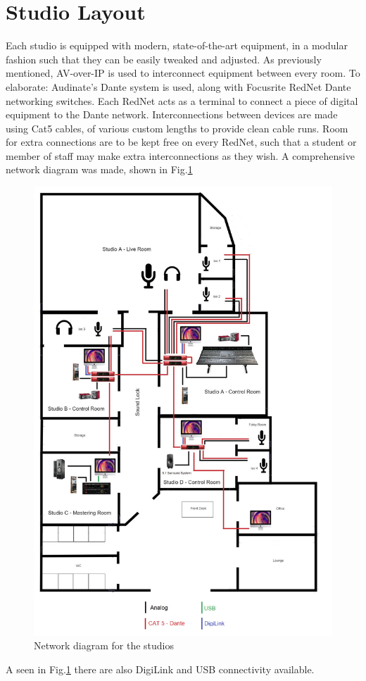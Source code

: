 \documentclass[10pt, twocolumn]{article}
\begin{document}
    \section{Studio Layout}
            Each studio is equipped with modern, state-of-the-art equipment, in a modular fashion such that they can be easily tweaked and adjusted.
            As previously mentioned, AV-over-IP is used to interconnect equipment between every room.
            To elaborate: Audinate's Dante system is used, along with Focusrite RedNet Dante networking switches.
            Each RedNet acts as a terminal to connect a piece of digital equipment to the Dante network.
            Interconnections between devices are made using Cat5 cables, of various custom lengths to provide clean cable runs.
            Room for extra connections are to be kept free on every RedNet, such that a student or member of staff may make extra interconnections as they wish.
            A comprehensive network diagram was made, shown in Fig.\ref{network}
            \begin{figure}[H]
                \centering
                \includegraphics[scale=0.2]{resources/network.png}
                \caption{Network diagram for the studios}
                \label{network}
            \end{figure}
            A seen in Fig.\ref{network} there are also DigiLink and USB connectivity available.
\end{document}
